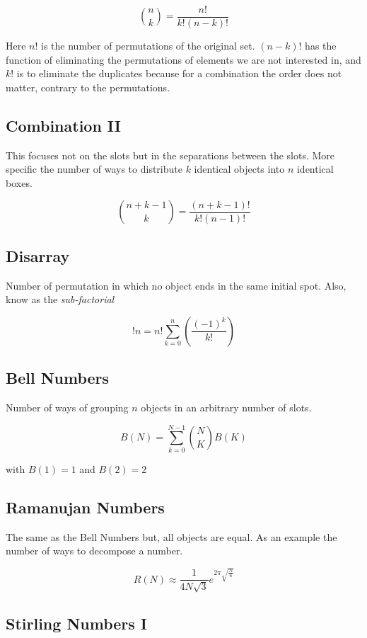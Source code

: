 \[
    \binom{n}{k} = \frac{n!}{k!(n-k)!}
\]

Here \(n\)! is the number of permutations of the original set.
\((n-k)\)! has the function of eliminating the permutations of elements we are not interested in, and
\(k\)! is to eliminate the duplicates because for a combination the order does not matter, contrary to
the permutations.

\subsection{Combination II}

This focuses not on the slots but in the separations between the slots.
More specific the number of ways to distribute \(k\) identical objects into \(n\) identical boxes. 

\[
    \binom{n + k - 1}{k} = \frac{(n + k - 1)!}{k!(n - 1)!}
\]

\subsection{Disarray}

Number of permutation in which no object ends in the same initial spot. Also, know as the 
\emph{sub-factorial}

\[
    !n = n! \sum_{k = 0}^{n} \left(\frac{{(-1)}^k}{k!}\right)
\]

\subsection{Bell Numbers}

Number of ways of grouping \(n\) objects in an arbitrary number of slots.

\[
    B(N) = \sum_{k = 0}^{N-1}\binom{N}{K}B(K)
\]

with \(B(1) = 1\) and \(B(2) = 2\)

\subsection{Ramanujan Numbers}

The same as the Bell Numbers but, all objects are equal. As an example the number of ways
to decompose a number.

\[
    R(N) \approx \frac{1}{4N\sqrt{3}} e^{2\pi \sqrt{\frac{N}{6}}}
\]

\subsection{Stirling Numbers I}

